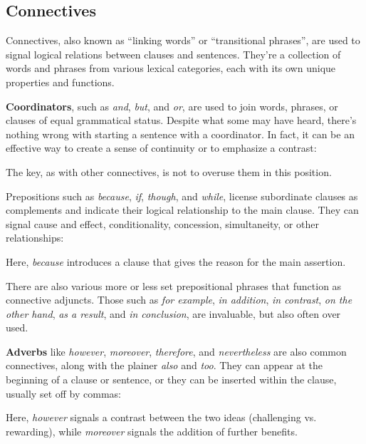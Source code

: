 \subsection{Connectives}

Connectives, also known as ``linking words'' or ``transitional phrases'', are used to signal logical relations between clauses and sentences. They're a collection of words and phrases from various lexical categories, each with its own unique properties and functions.

\textbf{Coordinators}, such as \textit{and}, \textit{but}, and \textit{or}, are used to join words, phrases, or clauses of equal grammatical status. Despite what some may have heard, there's nothing wrong with starting a sentence with a coordinator. In fact, it can be an effective way to create a sense of continuity or to emphasize a contrast:

\z
The key, as with other connectives, is not to overuse them in this position.

Prepositions such as \textit{because}, \textit{if}, \textit{though}, and \textit{while}, license subordinate clauses as complements and indicate their logical relationship to the main clause. They can signal cause and effect, conditionality, concession, simultaneity, or other relationships:

\z
Here, \textit{because} introduces a clause that gives the reason for the main assertion.

There are also various more or less set prepositional phrases that function as connective adjuncts. Those such as \textit{for example}, \textit{in addition}, \textit{in contrast},   \textit{on the other hand}, \textit{as a result}, and \textit{in conclusion}, are invaluable, but also often over used.

\textbf{Adverbs} like \textit{however}, \textit{moreover}, \textit{therefore}, and \textit{nevertheless} are also common connectives, along with the plainer \textit{also} and \textit{too}. They can appear at the beginning of a clause or sentence, or they can be inserted within the clause, usually set off by commas:

\z
Here, \textit{however} signals a contrast between the two ideas (challenging vs. rewarding), while \textit{moreover} signals the addition of further benefits.

